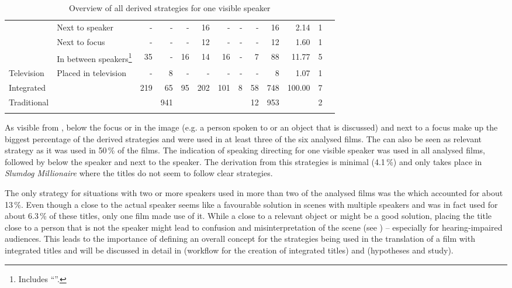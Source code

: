 \begin{sidewaystable}
\begin{tabularx}{\textwidth}{lQrrrrrrrrrr>{\raggedleft}p{6mm}}
& Next to speaker & - & - & - & 16 & - & - & - & 16 & 2.14 & 1\\
& Next to focus & - & - & - & 12 & - & - & - & 12 & 1.60 & 1\\
& In between speakers\footnote{Includes ``''.} & 35 & - & 16 & 14 & 16 & - & 7 & 88 & 11.77 & 5\\
Television & Placed in television & - & 8 & - & - & - & - & - & 8 & 1.07 & 1\\
\midrule
 Integrated &  &  219 &  65 &  95 &  202 &  101 &  8 &  58 &  748 &  100.00 &  7\\
\tablevspace
 Traditional &  &  & 941 &  &  &  &  & 12 & 953 &  & 2\\
\lspbottomrule
\end{tabularx} 
\caption{Overview of all derived strategies for one visible speaker}
\label{tab:TAB11}
\end{sidewaystable}

As visible from ,  below the focus or  in the image (e.g. a person spoken to or an object that is discussed) and next to a focus make up the biggest percentage of the derived strategies and were used in at least three of the six analysed films. The  can also be seen as relevant strategy as it was used in 50\,\% of the films. The indication of speaking directing for one visible speaker was used in all analysed films, followed by  below the speaker and next to the speaker. The derivation from this strategies is minimal (4.1\,\%) and only takes place in \textit{Slumdog Millionaire} where the titles do not seem to follow clear  strategies.

The only strategy for situations with two or more speakers used in more than two of the analysed films was the  which accounted for about 13\,\%. Even though a  close to the actual speaker seems like a favourable solution in scenes with multiple speakers and was in fact used for about 6.3\,\% of these titles, only one film made use of it. While a  close to a relevant object or  might be a good solution, placing the title close to a person that is not the speaker might lead to confusion and misinterpretation of the scene (see ) – especially for hearing-impaired audiences. This leads to the importance of defining an overall concept for the  strategies being used in the translation of a film with integrated titles and will be discussed in detail in  (workflow for the creation of integrated titles) and  (hypotheses and study).


